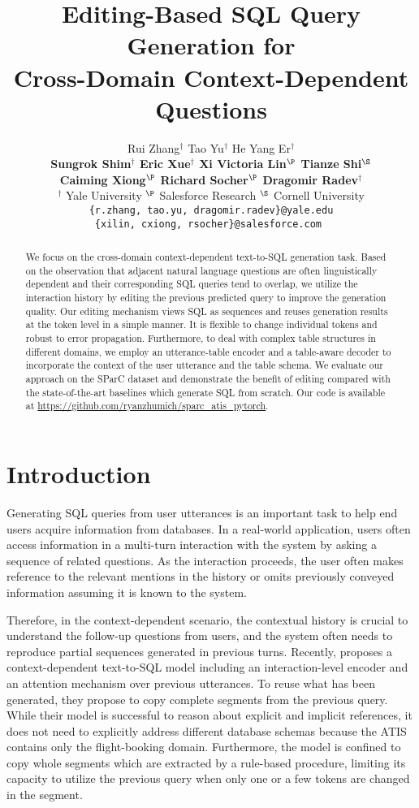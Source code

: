 \documentclass[11pt,a4paper]{article}
\title{Editing-Based SQL Query Generation for \\ Cross-Domain Context-Dependent Questions}
\author{
Rui Zhang$^\dagger$
\quad Tao Yu$^\dagger$
\quad He Yang Er$^\dagger$
\\{\bf
\quad Sungrok Shim$^\dagger$
\quad Eric Xue$^\dagger$
\quad Xi Victoria Lin$^\P$
\quad Tianze Shi$^\S$}
\\{\bf
\quad Caiming Xiong$^\P$
\quad Richard Socher$^\P$
\quad Dragomir Radev$^\dagger$}\\
$^\dagger$ Yale University
\quad $^\P$ Salesforce Research
\quad $^\S$ Cornell University\\
\tt{\{r.zhang, tao.yu, dragomir.radev\}@yale.edu}\\
\tt{\{xilin, cxiong, rsocher\}@salesforce.com}
}
\date{}
\begin{document}
\maketitle
\begin{abstract}
We focus on the cross-domain context-dependent text-to-SQL generation task.
Based on the observation that adjacent natural language questions are often linguistically dependent and their corresponding SQL queries tend to overlap, we utilize the interaction history by editing the previous predicted query to improve the generation quality.
Our editing mechanism views SQL as sequences and reuses generation results at the token level in a simple manner.
It is flexible to change individual tokens and robust to error propagation.
Furthermore, to deal with complex table structures in different domains, we employ an utterance-table encoder and a table-aware decoder to incorporate the context of the user utterance and the table schema.
We evaluate our approach on the SParC dataset and demonstrate the benefit of editing compared with the state-of-the-art baselines which generate SQL from scratch.
Our code is available at \url{https://github.com/ryanzhumich/sparc_atis_pytorch}.
\end{abstract}

\section{Introduction}
Generating SQL queries from user utterances is an important task to help end users acquire information from databases.
In a real-world application, users often access information in a multi-turn interaction with the system by asking a sequence of related questions.
As the interaction proceeds, 
the user often makes reference to the relevant mentions 
in the history or omits previously conveyed information assuming it is known to the system.

Therefore, in the context-dependent scenario, the contextual history is crucial to understand the follow-up questions from users, and the system often needs to reproduce partial sequences generated in previous turns.
Recently,  proposes a context-dependent text-to-SQL model including an interaction-level encoder and an attention mechanism over previous utterances.
To reuse what has been generated, they propose to copy complete segments from the previous query.
While their model is successful to reason about explicit and implicit references, it does not need to explicitly address different database schemas because the ATIS contains only the flight-booking domain.
Furthermore, the model is confined to copy whole segments which are extracted by a rule-based procedure, limiting its capacity to utilize the previous query when only one or a few tokens are changed in the segment.
\end{document}
